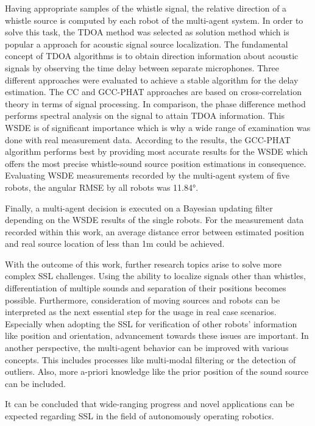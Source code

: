 Having appropriate samples of the whistle signal, the relative direction of a whistle source
is computed by each robot of the multi-agent system.
In order to solve this task, the \acf{TDOA} method was selected as solution method
which is popular a approach for acoustic signal source localization.
The fundamental concept of \ac{TDOA} algorithms is to obtain direction information
about acoustic signals by observing the time delay between separate microphones.
Three different approaches were evaluated to achieve a stable algorithm for the delay estimation.
The \acf{CC} and \acf{GCC-PHAT} approaches are based on cross-correlation theory in terms
of signal processing.
In comparison, the phase difference method performs spectral analysis on the signal
to attain \ac{TDOA} information.
This \acf{WSDE} is of significant importance which is why a wide range of examination
was done with real measurement data.
According to the results, the \acf{GCC-PHAT} algorithm performs best by
providing most accurate results for the \ac{WSDE} which offers the most precise
whistle-sound source position estimations in consequence.
Evaluating \ac{WSDE} measurements recorded by the multi-agent system of five robots,
the angular \ac{RMSE} by all robots was 11.84\si{\degree}.

Finally, a multi-agent decision is executed on a Bayesian updating filter
depending on the \ac{WSDE} results of the single robots.
For the measurement data recorded within this work, an average
distance error between estimated position and real source location
of less than 1\si{\meter} could be achieved.

With the outcome of this work, further research topics arise to solve
more complex \ac{SSL} challenges.
Using the ability to localize signals other than whistles,
differentiation of multiple sounds and separation of their positions becomes possible.
Furthermore, consideration of moving sources and robots can be interpreted
as the next essential step for the usage in real case scenarios.
Especially when adopting the \ac{SSL} for verification of other robots' information
like position and orientation, advancement towards these issues are
important.
In another perspective, the multi-agent behavior can be improved with various
concepts.
This includes processes like multi-modal filtering or the detection of outliers.
Also, more a-priori knowledge like the prior position of the sound source can be included.

It can be concluded that wide-ranging progress and novel applications can be expected
regarding \ac{SSL} in the field of autonomously operating robotics.

